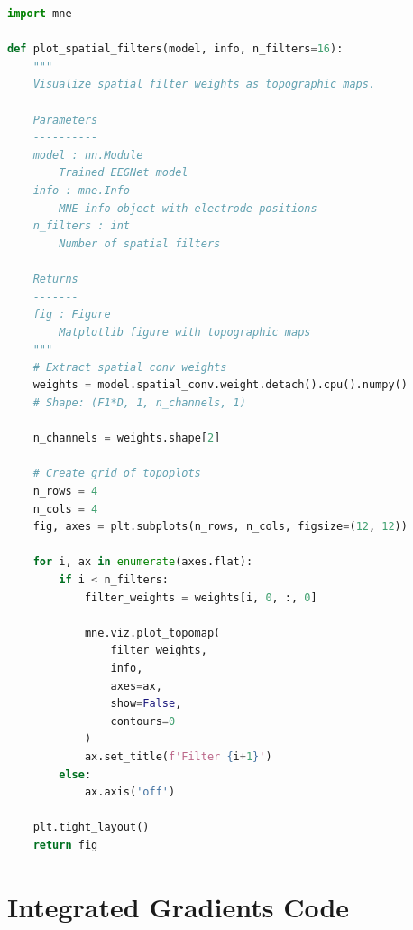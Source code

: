 \begin{lstlisting}[language=Python, caption={Spatial filter topography}, label={lst:spatial_filter}]
import mne

def plot_spatial_filters(model, info, n_filters=16):
    """
    Visualize spatial filter weights as topographic maps.
    
    Parameters
    ----------
    model : nn.Module
        Trained EEGNet model
    info : mne.Info
        MNE info object with electrode positions
    n_filters : int
        Number of spatial filters
    
    Returns
    -------
    fig : Figure
        Matplotlib figure with topographic maps
    """
    # Extract spatial conv weights
    weights = model.spatial_conv.weight.detach().cpu().numpy()
    # Shape: (F1*D, 1, n_channels, 1)
    
    n_channels = weights.shape[2]
    
    # Create grid of topoplots
    n_rows = 4
    n_cols = 4
    fig, axes = plt.subplots(n_rows, n_cols, figsize=(12, 12))
    
    for i, ax in enumerate(axes.flat):
        if i < n_filters:
            filter_weights = weights[i, 0, :, 0]
            
            mne.viz.plot_topomap(
                filter_weights, 
                info, 
                axes=ax,
                show=False,
                contours=0
            )
            ax.set_title(f'Filter {i+1}')
        else:
            ax.axis('off')
    
    plt.tight_layout()
    return fig
\end{lstlisting}


\section{Integrated Gradients Code}
\label{app:ig_code}

